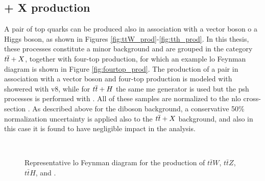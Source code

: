 \subsection{\ttbar + X production}

A pair of top quarks can be produced also in association with a vector boson o a Higgs boson, as shown in Figures \ref{fig:ttW_prod}-\ref{fig:tth_prod}.
In this thesis, these processes constitute a minor background and are grouped in the category $t\overline{t}+X$, together with four-top production,
for which an example \gls{lo} Feynman diagram is shown in Figure \ref{fig:fourtop_prod}. 
The production of a \ttbar pair in association with a vector boson and four-top production is modeled with \aNLO showered with \PY v8, while for $t\overline{t}+H$ the same 
\gls{me} generator is used but the \gls{psh} processes is performed with \HWpp. 
All of these samples are normalized to the \gls{nlo} cross-section \cite{Alwall:2014hca,Heinemeyer:2013tqa}.
As described above for the diboson background, a conservative 50\% normalization uncertainty is applied also to the 
$t\overline{t}+X$ background, and also in this case it is found to have negligible impact in the analysis. 

\begin{figure}[h!]
\centering 
{}
 \\
\caption{Representative \gls{lo} Feynman diagram for the production of  $t\bar{t}W$,  $t\bar{t}Z$,  $t\bar{t}H$, and  \fourtop.}\label{fig:ttX_prod}
\end{figure}

